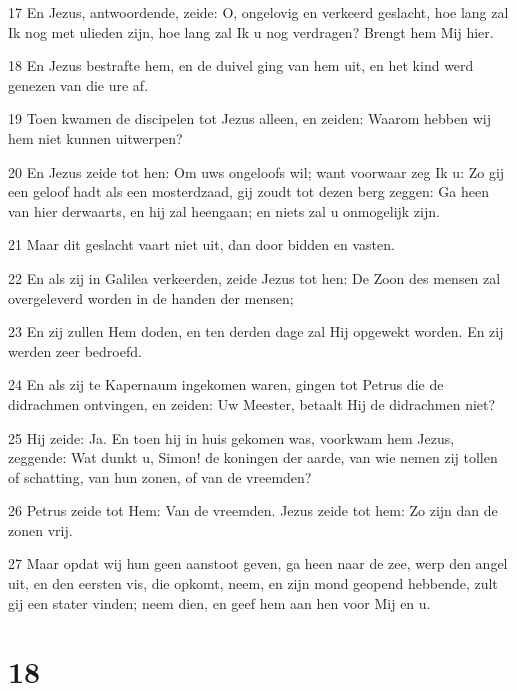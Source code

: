 \par 17 En Jezus, antwoordende, zeide: O, ongelovig en verkeerd geslacht, hoe lang zal Ik nog met ulieden zijn, hoe lang zal Ik u nog verdragen? Brengt hem Mij hier.
\par 18 En Jezus bestrafte hem, en de duivel ging van hem uit, en het kind werd genezen van die ure af.
\par 19 Toen kwamen de discipelen tot Jezus alleen, en zeiden: Waarom hebben wij hem niet kunnen uitwerpen?
\par 20 En Jezus zeide tot hen: Om uws ongeloofs wil; want voorwaar zeg Ik u: Zo gij een geloof hadt als een mosterdzaad, gij zoudt tot dezen berg zeggen: Ga heen van hier derwaarts, en hij zal heengaan; en niets zal u onmogelijk zijn.
\par 21 Maar dit geslacht vaart niet uit, dan door bidden en vasten.
\par 22 En als zij in Galilea verkeerden, zeide Jezus tot hen: De Zoon des mensen zal overgeleverd worden in de handen der mensen;
\par 23 En zij zullen Hem doden, en ten derden dage zal Hij opgewekt worden. En zij werden zeer bedroefd.
\par 24 En als zij te Kapernaum ingekomen waren, gingen tot Petrus die de didrachmen ontvingen, en zeiden: Uw Meester, betaalt Hij de didrachmen niet?
\par 25 Hij zeide: Ja. En toen hij in huis gekomen was, voorkwam hem Jezus, zeggende: Wat dunkt u, Simon! de koningen der aarde, van wie nemen zij tollen of schatting, van hun zonen, of van de vreemden?
\par 26 Petrus zeide tot Hem: Van de vreemden. Jezus zeide tot hem: Zo zijn dan de zonen vrij.
\par 27 Maar opdat wij hun geen aanstoot geven, ga heen naar de zee, werp den angel uit, en den eersten vis, die opkomt, neem, en zijn mond geopend hebbende, zult gij een stater vinden; neem dien, en geef hem aan hen voor Mij en u.

\chapter{18}

